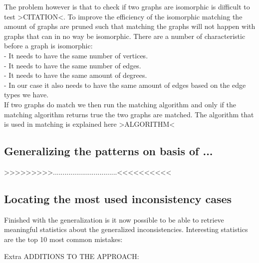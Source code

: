 \documentclass{article}
\begin{document}
The problem however is that to check if two graphs are isomorphic is difficult to test >CITATION<. 
To improve the efficiency of the isomorphic matching the amount of graphs are pruned such that matching the graphs will not happen with graphs that can in no way be isomorphic. There are a number of characteristic before a graph is isomorphic:\\
 - It needs to have the same number of vertices.\\
 - It needs to have the same number of edges.\\
 - It needs to have the same amount of degrees.\\
 - In our case it also needs to have the same amount of edges based on the edge types we have.\\
 
If two graphs do match we then run the matching algorithm and only if the matching algorithm returns true the two graphs are matched.
The algorithm that is used in matching is explained here >ALGORITHM<


\subsection{Generalizing the patterns on basis of ...}
>>>>>>>>>.................................<<<<<<<<<<


\subsection{Locating the most used inconsistency cases}
Finished with the generalization is it now possible to be able to retrieve meaningful statistics about the generalized inconsistencies. Interesting statistics are the top 10 most common mistakes:


Extra ADDITIONS TO THE APPROACH:
\end{document}
